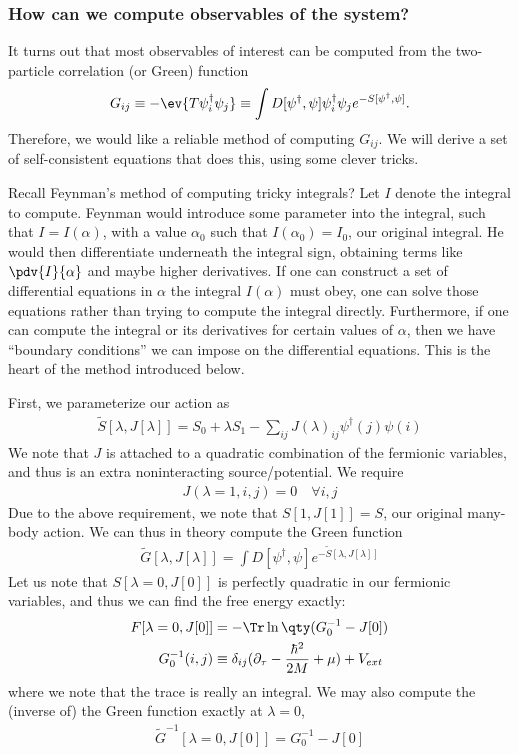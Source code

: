 \documentclass{article}
\begin{document}
\subsubsection*{How can we compute observables of the system?}

It turns out that most observables of interest can be computed from the two-particle correlation (or Green) function
\begin{align*}
  G_{ij} \equiv -\ev{T \psi^\dagger_i \psi_j} \equiv \int D[\psi^\dagger, \psi] \psi^\dagger_i \psi_j e^{-S[\psi^\dagger, \psi]}.
\end{align*}
Therefore, we would like a reliable method of computing $G_{ij}$. We will derive a set of self-consistent equations that does this, using some clever tricks.
\begin{remark}
  Recall Feynman's method of computing tricky integrals? Let $I$ denote the integral to compute. Feynman would introduce some parameter into the integral, such that $I = I(\alpha)$, with a value $\alpha_0$ such that $I(\alpha_0) = I_0$, our original integral. He would then differentiate underneath the integral sign, obtaining terms like $\pdv{I}{\alpha}$ and maybe higher derivatives. If one can construct a set of differential equations in $\alpha$ the integral $I(\alpha)$ must obey, one can solve those equations rather than trying to compute the integral directly. Furthermore, if one can compute the integral or its derivatives for certain values of $\alpha$, then we have ``boundary conditions'' we can impose on the differential equations. This is the heart of the method introduced below. 
\end{remark}
First, we parameterize our action as
\begin{align}
  \tilde S[\lambda, J[\lambda]] = S_0 + \lambda S_1 - \sum_{ij} J(\lambda)_{ij} \psi^\dagger(j) \psi(i)
\end{align}
We note that $J$ is attached to a quadratic combination of the fermionic variables, and thus is an extra noninteracting source/potential. We require
\begin{align}
  J(\lambda=1, i, j) = 0 \quad \forall i, j
\end{align}
Due to the above requirement, we note that $S[1, J[1]] = S$, our original many-body action. We can thus in theory compute the Green function
\begin{align*}
  \tilde G[\lambda, J[\lambda]] = \int D[\psi^\dagger, \psi] e^{-\tilde S[\lambda, J[\lambda]]}
\end{align*}
Let us note that $S[\lambda=0, J[0]]$ is perfectly quadratic in our fermionic variables, and thus we can find the free energy exactly: 
\begin{align}
  F[\lambda=0, J[0]] & = -\Tr \ln\qty(G_0^{-1} - J[0]) \\
  G_0^{-1}(i, j) & \equiv \delta_{ij}(\partial_\tau - \frac{\hbar^2}{2M} + \mu) + V_{ext}
\end{align}
where we note that the trace is really an integral. We may also compute the (inverse of) the Green function exactly at $\lambda=0$, 
\begin{align*}
  \tilde G^{-1}[\lambda=0, J[0]] = G_0^{-1} - J[0]
\end{align*}
\end{document}
